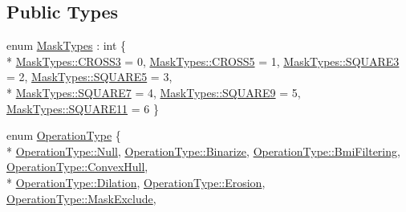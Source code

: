 \subsection*{Public Types}
\begin{DoxyCompactItemize}
\item 
enum \hyperlink{class_k_k_b_1_1_morph_op_a9eaa0383bf9e046da208af397e7e35eb}{Mask\+Types} \+: int \{ \\*
\hyperlink{class_k_k_b_1_1_morph_op_a9eaa0383bf9e046da208af397e7e35ebab8adbcea9dda2cf69140a0a91baa97c6}{Mask\+Types\+::\+C\+R\+O\+S\+S3} = 0, 
\hyperlink{class_k_k_b_1_1_morph_op_a9eaa0383bf9e046da208af397e7e35ebaced59e40e96d9f0ddb32016f2a4548ac}{Mask\+Types\+::\+C\+R\+O\+S\+S5} = 1, 
\hyperlink{class_k_k_b_1_1_morph_op_a9eaa0383bf9e046da208af397e7e35eba8dc0b7886154fdf311e7035c58aff432}{Mask\+Types\+::\+S\+Q\+U\+A\+R\+E3} = 2, 
\hyperlink{class_k_k_b_1_1_morph_op_a9eaa0383bf9e046da208af397e7e35eba994ef51927c0f0dba502b2617d0e4032}{Mask\+Types\+::\+S\+Q\+U\+A\+R\+E5} = 3, 
\\*
\hyperlink{class_k_k_b_1_1_morph_op_a9eaa0383bf9e046da208af397e7e35ebad5dad206d5246f258a016929477ff19d}{Mask\+Types\+::\+S\+Q\+U\+A\+R\+E7} = 4, 
\hyperlink{class_k_k_b_1_1_morph_op_a9eaa0383bf9e046da208af397e7e35eba149bb2b5c5ab20dabf7fa6ff53a735c2}{Mask\+Types\+::\+S\+Q\+U\+A\+R\+E9} = 5, 
\hyperlink{class_k_k_b_1_1_morph_op_a9eaa0383bf9e046da208af397e7e35eba0c74025e0ba778162e957991c2d0fa76}{Mask\+Types\+::\+S\+Q\+U\+A\+R\+E11} = 6
 \}
\item 
enum \hyperlink{class_k_k_b_1_1_morph_op_a32070d9c14d16849873a8a409f5b0d69}{Operation\+Type} \{ \\*
\hyperlink{class_k_k_b_1_1_morph_op_a32070d9c14d16849873a8a409f5b0d69abbb93ef26e3c101ff11cdd21cab08a94}{Operation\+Type\+::\+Null}, 
\hyperlink{class_k_k_b_1_1_morph_op_a32070d9c14d16849873a8a409f5b0d69a84a4d9fd8033f883ce95cae8c5b9859a}{Operation\+Type\+::\+Binarize}, 
\hyperlink{class_k_k_b_1_1_morph_op_a32070d9c14d16849873a8a409f5b0d69adec56b6e36a679a85668cb49ce961a1f}{Operation\+Type\+::\+Bmi\+Filtering}, 
\hyperlink{class_k_k_b_1_1_morph_op_a32070d9c14d16849873a8a409f5b0d69a3e1ee9920ed982b5da9becaf4b5463e5}{Operation\+Type\+::\+Convex\+Hull}, 
\\*
\hyperlink{class_k_k_b_1_1_morph_op_a32070d9c14d16849873a8a409f5b0d69a5a870896d32acca70f912a0c11edca66}{Operation\+Type\+::\+Dilation}, 
\hyperlink{class_k_k_b_1_1_morph_op_a32070d9c14d16849873a8a409f5b0d69a35b6b7b81c8d146da93c09daa3875ea0}{Operation\+Type\+::\+Erosion}, 
\hyperlink{class_k_k_b_1_1_morph_op_a32070d9c14d16849873a8a409f5b0d69a2166273bd619a450f27a35e9c9e421c3}{Operation\+Type\+::\+Mask\+Exclude}, 

\end{DoxyCompactItemize}
